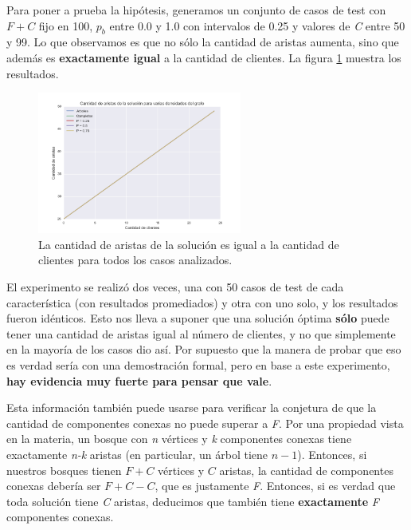 \documentclass[a4paper]{report}
\begin{document}
Para poner a prueba la hipótesis, generamos un conjunto de casos de test con $F + C$ fijo en 100, $p_{b}$ entre 0.0 y 1.0 con intervalos de 0.25 y valores de \textit{C} entre 50 y 99. Lo que observamos es que no sólo la cantidad de aristas aumenta, sino que además es \textbf{exactamente igual} a la cantidad de clientes. La figura \ref{fig:tamanosolucion} muestra los resultados.

\begin{figure}[!h]
    \centering
    \includegraphics[width=0.6\textwidth]{tamanosolucion.png}
    \caption{La cantidad de aristas de la solución es igual a la cantidad de clientes para todos los casos analizados.}
    \label{fig:tamanosolucion}
\end{figure}

\newpage

El experimento se realizó dos veces, una con 50 casos de test de cada característica (con resultados promediados) y otra con uno solo, y los resultados fueron idénticos. Esto nos lleva a suponer que una solución óptima \textbf{sólo} puede tener una cantidad de aristas igual al número de clientes, y no que simplemente en la mayoría de los casos dio así. Por supuesto que la manera de probar que eso es verdad sería con una demostración formal, pero en base a este experimento, \textbf{hay evidencia muy fuerte para pensar que vale}.

Esta información también puede usarse para verificar la conjetura de que la cantidad de componentes conexas no puede superar a \textit{F}. Por una propiedad vista en la materia, un bosque con \textit{n} vértices y \textit{k} componentes conexas tiene exactamente \textit{n-k} aristas (en particular, un árbol tiene $n-1$). Entonces, si nuestros bosques tienen $F+C$ vértices y $C$ aristas, la cantidad de componentes conexas debería ser $F+C-C$, que es justamente \textit{F}. Entonces, si es verdad que toda solución tiene \textit{C} aristas, deducimos que también tiene \textbf{exactamente} \textit{F} componentes conexas.
\end{document}
